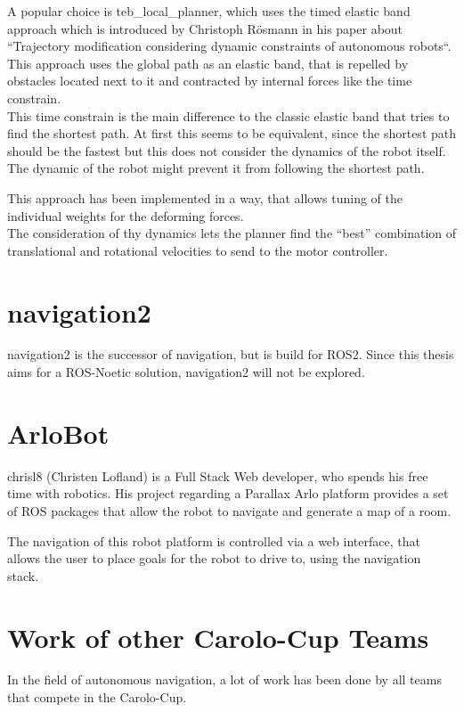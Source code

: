 A popular choice is teb\_local\_planner, which uses the timed elastic band approach which is introduced by Christoph Rösmann in his paper about ``Trajectory modification considering dynamic constraints of autonomous robots``.\\
This approach uses the global path as an elastic band, that is repelled by obstacles located next to it and contracted by internal forces like the time constrain.\\
This time constrain is the main difference to the classic elastic band that tries to find the shortest path. At first this seems to be equivalent, since the shortest path should be the fastest but this does not consider the dynamics of the robot itself. 
The dynamic of the robot might prevent it from following the shortest path\cite{Rsmann2012TrajectoryMC}. 

This approach has been implemented in a way, that allows tuning of the individual weights for the deforming forces.\\

The consideration of thy dynamics lets the planner find the ``best'' combination of translational and rotational velocities to send to the motor controller.
\section{navigation2}

navigation2 is the successor of navigation, but is build for ROS2.
Since this thesis aims for a ROS-Noetic solution, navigation2 will not be explored.

\section{ArloBot}
chrisl8 (Christen Lofland) is a Full Stack Web developer, who spends his free time with robotics. His project regarding a Parallax Arlo platform provides a set of ROS packages that allow the robot to navigate and generate a map of a room\cite{chrisl8}.

The navigation of this robot platform is controlled via a web interface, that allows the user to place goals for the robot to drive to, using the navigation stack.

\section{Work of other Carolo-Cup Teams}
In the field of autonomous navigation, a lot of work has been done by all teams that compete in the Carolo-Cup.\\

